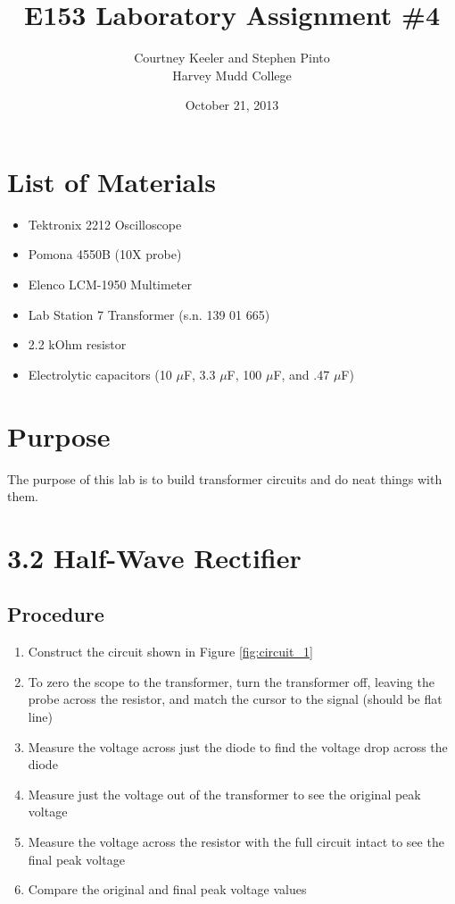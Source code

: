 \documentclass[12pt,letterpaper]{report}
\begin{document}
\title{E153 Laboratory Assignment \#4}
\author{Courtney Keeler and Stephen Pinto\\
Harvey Mudd College}
\date{October 21, 2013}
\maketitle

\section*{List of Materials}
\begin{itemize}
	\item Tektronix 2212 Oscilloscope
	\item Pomona 4550B (10X probe)
	\item Elenco LCM-1950 Multimeter
	\item Lab Station 7 Transformer (s.n. 139 01 665)
	\item 2.2 kOhm resistor
	\item Electrolytic capacitors (10 $\mu$F, 3.3 $\mu$F, 100 $\mu$F, and .47 $\mu$F)
\end{itemize}

\section*{Purpose}
The purpose of this lab is to build transformer circuits and do neat things with them.

\section*{3.2 Half-Wave Rectifier}
\subsection*{Procedure}

\begin{enumerate}
\item Construct the circuit shown in Figure \ref{fig:circuit_1}
\item To zero the scope to the transformer, turn the transformer off, leaving the probe across the resistor, and match the cursor to the signal (should be flat line)
\item Measure the voltage across just the diode to find the voltage drop across the diode
\item Measure just the voltage out of the transformer to see the original peak voltage
\item Measure the voltage across the resistor with the full circuit intact to see the final peak voltage
\item Compare the original and final peak voltage values
\end{enumerate}
\end{document}
